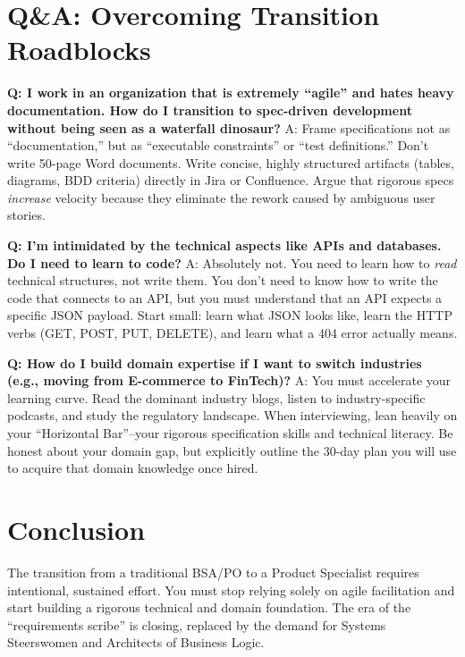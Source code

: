 \documentclass[
  11pt,
  openany,
  oneside]{book}
\begin{document}
\section{Q\&A: Overcoming Transition
Roadblocks}\label{qa-overcoming-transition-roadblocks}

\textbf{Q: I work in an organization that is extremely ``agile'' and
hates heavy documentation. How do I transition to spec-driven
development without being seen as a waterfall dinosaur?} A: Frame
specifications not as ``documentation,'' but as ``executable
constraints'' or ``test definitions.'' Don't write 50-page Word
documents. Write concise, highly structured artifacts (tables, diagrams,
BDD criteria) directly in Jira or Confluence. Argue that rigorous specs
\emph{increase} velocity because they eliminate the rework caused by
ambiguous user stories.

\textbf{Q: I'm intimidated by the technical aspects like APIs and
databases. Do I need to learn to code?} A: Absolutely not. You need to
learn how to \emph{read} technical structures, not write them. You don't
need to know how to write the code that connects to an API, but you must
understand that an API expects a specific JSON payload. Start small:
learn what JSON looks like, learn the HTTP verbs (GET, POST, PUT,
DELETE), and learn what a 404 error actually means.

\textbf{Q: How do I build domain expertise if I want to switch
industries (e.g., moving from E-commerce to FinTech)?} A: You must
accelerate your learning curve. Read the dominant industry blogs, listen
to industry-specific podcasts, and study the regulatory landscape. When
interviewing, lean heavily on your ``Horizontal Bar''--your rigorous
specification skills and technical literacy. Be honest about your domain
gap, but explicitly outline the 30-day plan you will use to acquire that
domain knowledge once hired.

\bigskip

\section{Conclusion}\label{conclusion-1}

The transition from a traditional BSA/PO to a Product Specialist
requires intentional, sustained effort. You must stop relying solely on
agile facilitation and start building a rigorous technical and domain
foundation. The era of the ``requirements scribe'' is closing, replaced
by the demand for Systems Steerswomen and Architects of Business Logic.
\end{document}
